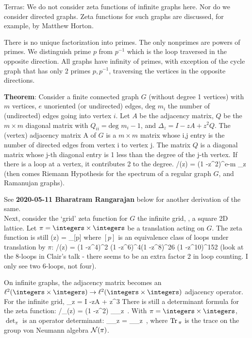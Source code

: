 Terras:
We do not consider zeta functions of infinite graphs here. Nor do we
consider directed graphs. Zeta functions for such graphs are discussed,
for example, by Matthew Horton.

There is no unique factorization into primes. The only nonprimes are
powers of primes. We distinguish prime $p$ from $p^{-1}$ which is the
loop traversed in the opposite direction. All graphs have infinity of
primes, with exception of the cycle graph that has only 2 primes
$p,p^{-1}$, traversing the vertices in the opposite directions.

\textbf{Theorem}:
Consider  a finite connected graph $G$  (without degree 1 vertices) with
$m$ vertices, $e$ unoriented (or undirected) edges, $\mbox{deg }m_i$ the
number of (undirected) edges going into vertex $i$. Let $A$ be the
adjacency matrix, $Q$ be the $m \times m$ diagonal matrix with
$Q_{ii} = \mbox{deg }m_i - 1$,
and
$\Delta_z = I -zA + z^2Q$.
The (vertex) adjacency matrix A of $G$ is a $m \times m$ matrix whose i,j
entry is the number of directed edges from vertex i to vertex j. The
matrix $ Q$ is a diagonal matrix whose j-th diagonal entry is 1 less than
the degree of the j-th vertex. If there is a loop at a vertex, it
contributes 2 to the degree.
/\zeta(z) = (1 -z^2)^{e-m} \det\Delta_z
(then comes Riemann Hypothesis for the spectrum of a regular graph $G$,
and Ramanujan graphs).

See {\bf 2020-05-11 Bharatram Rangarajan} 
below for another derivation of the
same.
\\

Next, consider the `grid' zeta function for $G$
the infinite grid, \ie, a square 2D lattice. Let
$\pi = \integers \times \integers$ be a translation acting on $G$.
The zeta function is still
\beq
\zeta(z) = \prod_{[p]} 
where $[p]$ is an equivalence class of loops
under translation by $\pi$:
/\zeta(z) = (1 -z^4)^2 (1 -z^6)^4(1 -z^8)^{26}
             (1 -z^10)^{152} \cdots
{}
(look at the 8-loops in Clair's talk - there seems to be an extra factor 2
in loop counting. I only see two 6-loops, not four).

On infinite graphs, the adjacency matrix becomes an
$\ell^2 (\integers \times \integers) \to \ell^2 (\integers \times \integers)$
adjacency operator.
For the infinite grid,
\beq
\Delta_z = I -zA + z^3
There is still a determinant formula for the zeta function:
/\zeta_\pi(z) = (1 -z^2) \det_\pi\Delta_z
\,.
With $\pi = \integers \times \integers$, $\det_\pi$ is an operator determinant:
\beq
\det_\pi\Delta_z = \exp \Tr_\pi \ln \Delta_z
\,,
where $\mbox{\rm Tr}\,_\pi$ is the trace on the group von Neumann algebra ${\cal N}(\pi)$.

